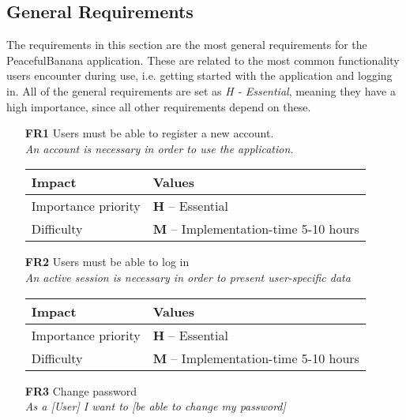 \subsection{General Requirements}
The requirements in this section are the most general requirements for the PeacefulBanana application. These are related to the most common functionality users encounter during use, i.e. getting started with the application and logging in. All of the general requirements are set as \emph{H - Essential}, meaning they have a high importance, since all other requirements depend on these. 
\begin{itemize}
    \vspace{0.5cm}
	\item[\textbf{FR1}] Users must be able to register a new account. \\
        \textit{\small{An account is necessary in order to use the application. }}

        \begin{tabular}{| l | p{7cm} |}
            \hline
            \rowcolor[gray]{0.8}
            \textbf{Impact} & \textbf{Values} \\
            \hline
            Importance priority & \textbf{H} -- Essential \\
            Difficulty & \textbf{M} -- Implementation-time 5-10 hours\\
            \hline
        \end{tabular}
    \vspace{0.5cm}
    \item[\textbf{FR2}] Users must be able to log in \\
        \textit{\small{An active session is necessary in order to present user-specific data}}

        \begin{tabular}{| l | p{7cm} |}
            \hline
            \rowcolor[gray]{0.8}
            \textbf{Impact} & \textbf{Values} \\
            \hline
            Importance priority & \textbf{H} -- Essential \\
            Difficulty & \textbf{M} -- Implementation-time 5-10 hours \\
            \hline
        \end{tabular}
    \vspace{0.5cm}

    \item[\textbf{FR3}] Change password \\
        \textit{\small{As a [User] I want to [be able to change my password]}}


\end{itemize}
